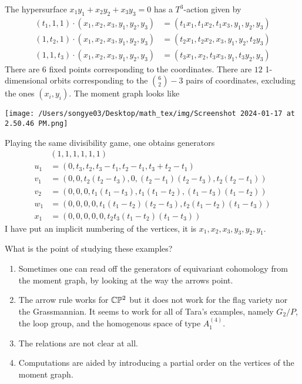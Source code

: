 \documentclass[12pt]{article}
\begin{document}
\begin{example}
    The hypersurface $x_1y_1 + x_2y_2 + x_3y_3 = 0$ has a $T^3$-action given by
    \begin{align*}
        (t_1,1,1)\cdot (x_1,x_2,x_3,y_1,y_2,y_3) &= (t_1x_1,t_1x_2,t_1x_3,y_1,y_2,y_3) \\ 
        (1,t_2,1)\cdot (x_1,x_2,x_3,y_1,y_2,y_3) &= (t_2x_1,t_2x_2,x_3,y_1,y_2,t_2y_3) \\ 
        (1,1,t_3)\cdot (x_1,x_2,x_3,y_1,y_2,y_3) &= (t_3x_1,x_2,t_3x_3,y_1,t_3y_2,y_3)
    \end{align*}
    There are $6$ fixed points corresponding to the coordinates. There are $12$ 1-dimensional orbits corresponding to 
    the $\binom{6}{2} - 3$ pairs of coordinates, excluding the ones $(x_i,y_i)$. The moment graph looks like 
    \begin{center}
        \texttt{[image: /Users/songye03/Desktop/math\_tex/img/Screenshot 2024-01-17 at 2.50.46 PM.png]}
    \end{center}
    Playing the same divisibility game, one obtains generators \begin{align*}
        & (1,1,1,1,1,1) \\
        u_1 &= (0,t_3,t_2,t_3-t_1,t_2-t_1,t_3 + t_2 - t_1) \\ 
        v_1 &= (0,0,t_2(t_2-t_3),0,(t_2-t_1)(t_2-t_3),t_2(t_2-t_1)) \\
        v_2 &= (0,0,0,t_1(t_1-t_3),t_1(t_1-t_2),(t_1-t_3)(t_1-t_2)) \\
        w_1 &= (0,0,0,0,t_1(t_1-t_2)(t_2-t_3),t_2(t_1-t_2)(t_1-t_3)) \\
        x_1 &= (0,0,0,0,0,t_2t_3(t_1-t_2)(t_1-t_3))
    \end{align*} I have put an implicit numbering of the vertices, it is $x_1,x_2,x_3,y_3,y_2,y_1$. 
\end{example}

\begin{remark}
    What is the point of studying these examples?
    \begin{enumerate}
        \item Sometimes one can read off the generators of equivariant cohomology from the moment graph, by looking at the way the arrows point.
        \item The arrow rule works for $\mathbb{C}\mathbb{P}^2$ but it does not work for the flag variety nor the Grassmannian. It seems to work for all of Tara's examples, namely $G_2/P$, the loop group, and the homogenous space of type $A_1^{(4)}$.
        \item The relations are not clear at all.
        \item Computations are aided by introducing a partial order on the vertices of the moment graph. 
    \end{enumerate}
\end{remark}
\end{document}
